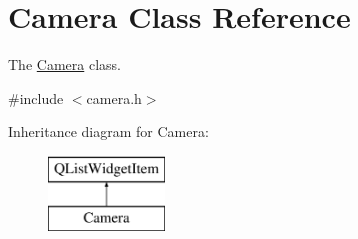 \hypertarget{classCamera}{\section{Camera Class Reference}
\label{classCamera}
}


The \hyperlink{classCamera}{Camera} class.  




{\ttfamily \#include $<$camera.\-h$>$}

Inheritance diagram for Camera\-:\begin{figure}[H]
\begin{center}
\leavevmode
\includegraphics[height=2.000000cm]{classCamera}
\end{center}
\end{figure}
